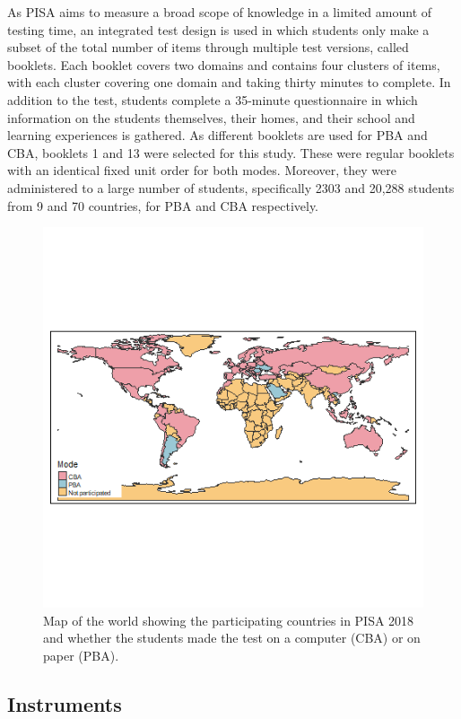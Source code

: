 \documentclass{article}
\begin{document}
As PISA aims to measure a broad scope of knowledge in a limited amount of testing time, an integrated test design is used in which students only make a subset of the total number of items through multiple test versions, called booklets. Each booklet covers two domains and contains four clusters of items, with each cluster covering one domain and taking thirty minutes to complete. In addition to the test, students complete a 35-minute questionnaire in which information on the students themselves, their homes, and their school and learning experiences is gathered. As different booklets are used for PBA and CBA, booklets 1 and 13 were selected for this study. These were regular booklets with an identical fixed unit order for both modes. Moreover, they were administered to a large number of students, specifically 2303 and 20,288 students from 9 and 70 countries, for PBA and CBA respectively. 

\begin{figure} [!ht]
    \centering
    \includegraphics[scale = 0.58]{mode_map.png}
    \caption{Map of the world showing the participating countries in PISA 2018 and whether the students made the test on a computer (CBA) or on paper (PBA).}
    \label{fig:landenkaart}
\end{figure}

\subsection{Instruments}
\end{document}
